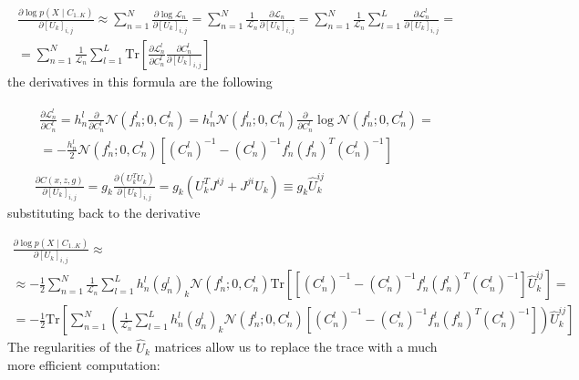 \documentclass{paper}
\begin{document}
\begin{equation}
\begin{split}
\frac{\partial \log p(X \mid C_{1..K})}{\partial \left[ U_k \right]_{i,j}} \approx \sum_{n=1}^N \frac{\partial \log \mathcal{L}_n}{\partial \left[ U_k \right]_{i,j}} = \sum_{n=1}^N \frac{1}{\mathcal{L}_n} \frac{\partial \mathcal{L}_n}{\partial \left[ U_k \right]_{i,j}} = \sum_{n=1}^N \frac{1}{\mathcal{L}_n}  \sum_{l=1}^{L} \frac{\partial \mathcal{L}_n^l}{\partial \left[ U_k \right]_{i,j}} = \\
=  \sum_{n=1}^N \frac{1}{\mathcal{L}_n}  \sum_{l=1}^{L} \textrm{Tr} \left[ \frac{\partial \mathcal{L}_n^l}{\partial C_n^l} \frac{\partial C_n^l}{\partial \left[ U_k \right]_{i,j}} \right]
\end{split}
\end{equation}
% 
the derivatives in this formula are the following

\begin{eqnarray}
\begin{split}
\frac{\partial \mathcal{L}_n^l}{\partial C_n^l} = h_n^l \frac{\partial}{\partial C_n^l} \mathcal{N}(f_n^l;0,C_n^l) = h_n^l \mathcal{N}(f_n^l;0,C_n^l) \frac{\partial}{\partial C_n^l} \log \mathcal{N}(f_n^l;0,C_n^l) = \\
= -\frac{h_n^l}{2} \mathcal{N}(f_n^l;0,C_n^l) \left[ (C_n^l)^{-1} - (C_n^l)^{-1} f_n^l (f_n^l)^T (C_n^l)^{-1} \right]
\end{split} \\
\frac{\partial C(x,z,g)}{\partial \left[ U_k \right]_{i,j}} = g_k \frac{\partial \left( U_k^T U_k \right)}{\partial \left[ U_k \right]_{i,j}} = g_k \left( U_k^T J^{ij} + J^{ji} U_k \right) \equiv g_k \hat U_k^{ij}
\end{eqnarray}
%
substituting back to the derivative

\begin{equation}
\begin{split}
\frac{\partial \log p(X \mid C_{1..K})}{\partial \left[ U_k \right]_{i,j}} \approx \\
\approx  -\frac{1}{2} \sum_{n=1}^N \frac{1}{\mathcal{L}_n}  \sum_{l=1}^{L} h_n^l (g_n^l)_k \mathcal{N}(f_n^l;0,C_n^l)  \textrm{Tr} \left[ \left[ (C_n^l)^{-1} - (C_n^l)^{-1} f_n^l (f_n^l)^T (C_n^l)^{-1} \right] \hat U_k^{ij} \right] = \\
= -\frac{1}{2} \textrm{Tr} \left[ \sum_{n=1}^N \left(\frac{1}{\mathcal{L}_n}  \sum_{l=1}^{L} h_n^l (g_n^l)_k \mathcal{N}(f_n^l;0,C_n^l)   \left[ (C_n^l)^{-1} - (C_n^l)^{-1} f_n^l (f_n^l)^T (C_n^l)^{-1} \right] \right) \hat U_k^{ij} \right]
\end{split}
\end{equation}
%
The regularities of the $\hat U_k$ matrices allow us to replace the trace with a much more efficient computation:
\end{document}
